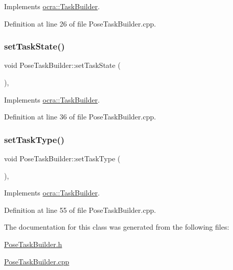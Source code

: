 Implements \hyperlink{classocra_1_1TaskBuilder_a7a2c8bcc5d95160d0e48806a2648f1a5}{ocra\+::\+Task\+Builder}.



Definition at line 26 of file Pose\+Task\+Builder.\+cpp.

\hypertarget{classocra_1_1PoseTaskBuilder_a3bc6c07a3ee7656a1f3051500baddbd8}{}\label{classocra_1_1PoseTaskBuilder_a3bc6c07a3ee7656a1f3051500baddbd8} 
\subsubsection{\texorpdfstring{set\+Task\+State()}{setTaskState()}}
{\footnotesize\ttfamily void Pose\+Task\+Builder\+::set\+Task\+State (\begin{DoxyParamCaption}{ }\end{DoxyParamCaption})\hspace{0.3cm}{\ttfamily [protected]}, {\ttfamily [virtual]}}



Implements \hyperlink{classocra_1_1TaskBuilder_a7b44bfa101566ea4400e2d9bfdb9ff32}{ocra\+::\+Task\+Builder}.



Definition at line 36 of file Pose\+Task\+Builder.\+cpp.

\hypertarget{classocra_1_1PoseTaskBuilder_aafc5b611352f7cbebecaa51cf534c68c}{}\label{classocra_1_1PoseTaskBuilder_aafc5b611352f7cbebecaa51cf534c68c} 
\subsubsection{\texorpdfstring{set\+Task\+Type()}{setTaskType()}}
{\footnotesize\ttfamily void Pose\+Task\+Builder\+::set\+Task\+Type (\begin{DoxyParamCaption}{ }\end{DoxyParamCaption})\hspace{0.3cm}{\ttfamily [protected]}, {\ttfamily [virtual]}}



Implements \hyperlink{classocra_1_1TaskBuilder_a1a979fc495be6dc30483aa8fd0ff2650}{ocra\+::\+Task\+Builder}.



Definition at line 55 of file Pose\+Task\+Builder.\+cpp.



The documentation for this class was generated from the following files\+:\begin{DoxyCompactItemize}
\item 
\hyperlink{PoseTaskBuilder_8h}{Pose\+Task\+Builder.\+h}\item 
\hyperlink{PoseTaskBuilder_8cpp}{Pose\+Task\+Builder.\+cpp}\end{DoxyCompactItemize}

